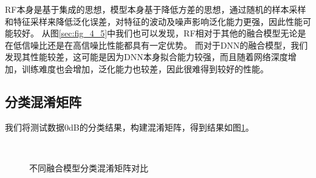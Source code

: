 RF本身是基于集成的思想，模型本身基于降低方差的思想，通过随机的样本采样和特征采样来降低泛化误差，对特征的波动及噪声影响泛化能力更强，因此性能可能较好。
从图\ref{sec:fig_4_5}中我们也可以发现，RF相对于其他的融合模型无论是在低信噪比还是在高信噪比性能都具有一定优势。
而对于DNN的融合模型，我们发现其性能较差，这可能是因为DNN本身拟合能力较强，而且随着网络深度增加，训练难度也会增加，泛化能力也较差，因此很难得到较好的性能。\par

\subsection{分类混淆矩阵}

我们将测试数据0dB的分类结果，构建混淆矩阵，得到结果如图\ref{sec:fig_4_6}。\par
\begin{figure}[h]
	\centering
	\\
	\caption{不同融合模型分类混淆矩阵对比}
	\label{sec:fig_4_6}
\end{figure}

